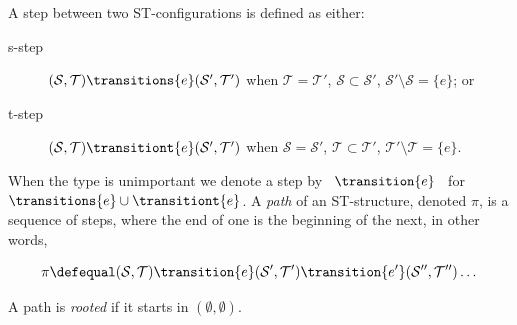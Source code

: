     \begin{definition}
    \label{def:st-steps}
        A step between two ST-configurations is defined as either:
        
        \begin{description}
            \item[s-step] $(\mathcal{S},\mathcal{T})\transitions{e}(\mathcal{S}',\mathcal{T}')$ when $\mathcal{T}=\mathcal{T}'$, $\mathcal{S} \subset \mathcal{S}'$, $\mathcal{S}' \setminus \mathcal{S}=\{e\}$; or
            \item[t-step] $(\mathcal{S},\mathcal{T})\transitiont{e}(\mathcal{S}',\mathcal{T}')$ when $\mathcal{S}=\mathcal{S}'$, $\mathcal{T} \subset \mathcal{T}'$, $\mathcal{T}' \setminus \mathcal{T}=\{e\}$.
        \end{description}
        When the type is unimportant we denote a step by \, $\transition{e}$ \, for \, $\transitions{e}\cup\transitiont{e}$. A \emph{path} of an ST-structure, denoted $\pi$, is a sequence of steps, where the end of one is the beginning of the next, in other words,
        
        \[
            \pi\defequal(\mathcal{S},\mathcal{T})\transition{e}(\mathcal{S}',\mathcal{T}')\transition{e'}(\mathcal{S}'',\mathcal{T}'')\dots
        \]

        A path is \emph{rooted} if it starts in $(\emptyset,\emptyset)$.
    \end{definition}

%        

    
